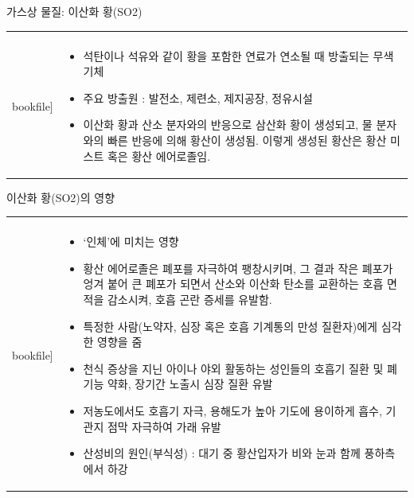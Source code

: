 \begin{frame}[t]{가스상 물질: 이산화 황(SO2)}
	\begin{tabular}{ll}
		\begin{minipage}[t]{0.3\textwidth}\scriptsize
			\begin{figure}[t]
				\texttt{[image: \\bookfile]}
			\end{figure}
		\end{minipage}	
		&
		\begin{minipage}[t]{0.65\textwidth} \scriptsize	
			\begin{itemize}
				\item 석탄이나 석유와 같이 황을 포함한 연료가 연소될 때 방출되는 무색 기체
				\item 주요 방출원 : 발전소, 제련소, 제지공장, 정유시설
				\item 이산화 황과 산소 분자와의 반응으로 삼산화 황이 생성되고, 물 분자와의 빠른 반응에 의해 황산이 생성됨. 이렇게 생성된 황산은 황산 미스트 혹은 황산 에어로졸임.
					
			\end{itemize}

		\end{minipage}
	\end{tabular}
\end{frame}



\begin{frame}[t]{이산화 황(SO2)의 영향}
	\begin{tabular}{ll}
		\begin{minipage}[t]{0.3\textwidth}\scriptsize
			\begin{figure}[t]
				\texttt{[image: \\bookfile]}
			\end{figure}
		\end{minipage}	
		&
		\begin{minipage}[t]{0.65\textwidth} \scriptsize	
			\begin{itemize}
				\item ‘인체’에 미치는 영향
				\item 황산 에어로졸은 폐포를 자극하여 팽창시키며, 그 결과 작은 폐포가 엉겨 붙어 큰 폐포가 되면서 산소와 이산화 탄소를 교환하는 호흡 면적을 감소시켜, 호흡 곤란 증세를 유발함.
				\item 특정한 사람(노약자, 심장 혹은 호흡 기계통의 만성 질환자)에게 심각한 영향을 줌
				\item 천식 증상을 지닌 아이나 야외 활동하는 성인들의 호흡기 질환 및 폐기능 약화, 장기간 노출시 심장 질환 유발
				\item 저농도에서도 호흡기 자극, 용해도가 높아 기도에 용이하게 흡수, 기관지 점막 자극하여 가래 유발
				\item 산성비의 원인(부식성) : 대기 중 황산입자가 비와 눈과 함께 풍하측에서 하강
					
			\end{itemize}

		\end{minipage}
	\end{tabular}
\end{frame}



